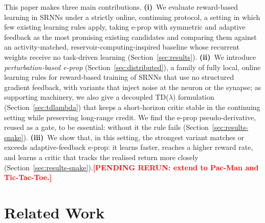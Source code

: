 \documentclass[10pt,twocolumn]{article}
\newcommand{\pending}[1]{\textcolor{red}{\bfseries[PENDING RERUN#1]}}
\newcommand{\method}{perturbation-based e-prop}   %
\begin{document}
This paper makes three main contributions. \textbf{(i)}~We evaluate
reward-based learning in SRNNs under a strictly online, continuing protocol, a
setting in which few existing learning rules apply, taking e-prop with
symmetric and adaptive feedback as the most promising existing candidates and
comparing them against an activity-matched, reservoir-computing-inspired
baseline whose recurrent weights receive no task-driven learning
(Section~\ref{sec:results}). \textbf{(ii)}~We introduce \emph{\method{}} (Section~\ref{sec:distributed}), a family of fully local, online
learning rules for reward-based training of SRNNs that use no structured
gradient feedback, with variants that inject noise at the neuron or the
synapse; as supporting machinery, we also give a decoupled TD($\lambda$)
formulation (Section~\ref{sec:tdlambda}) that keeps a short-horizon critic
stable in the continuing setting while preserving long-range credit. We find
the e-prop pseudo-derivative, reused as a gate, to be essential: without it
the rule fails (Section~\ref{sec:results-snake}). \textbf{(iii)}~We show that,
in this setting, the strongest variant matches or exceeds adaptive-feedback
e-prop: it learns faster, reaches a higher reward rate, and learns a critic
that tracks the realised return more closely
(Section~\ref{sec:results-snake}).\pending{: extend to Pac-Man and
Tic-Tac-Toe.}


\section{Related Work}
\label{sec:related}
\end{document}
